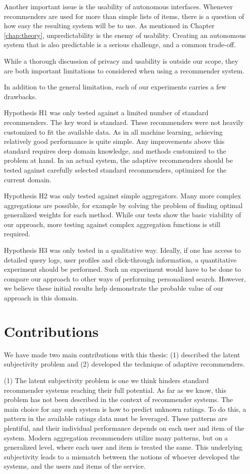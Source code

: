 Another important issue is the usability of autonomous interfaces.
Whenever recommenders are used for more than simple lists of items,
there is a question of how easy the resulting system will be to use.
As mentioned in Chapter \ref{chap:theory},
unpredictability is the enemy of usability.
Creating an autonomous system that is also
predictable is a serious challenge, and a common trade-off.

While a thorough discussion of privacy and usability is 
outside our scope, they are both important limitations to considered
when using a recommender system.

In addition to the general limitation, each of our experiments
carries a few drawbacks.

Hypothesis H1 was only tested against a limited number of standard recommenders.
The key word is standard. These recommenders were not heavily customized
to fit the available data. As in all machine learning,
achieving relatively good performance is quite simple.
Any improvements above this standard requires deep domain knowledge,
and methods customized to the problem at hand.
In an actual system, the adaptive recommenders should be tested
against carefully selected standard recommenders,
optimized for the current domain.

Hypothesis H2 was only tested against simple aggregators.
Many more complex aggregations are possible,
for example by solving the problem of finding
optimal generalized weights for each method.
While our tests show the basic viability of our approach,
more testing against complex aggregation functions
is still required.

Hypothesis H3 was only tested in a qualitative way.
Ideally, if one has access to detailed query logs,
user profiles and click-through information,
a quantitative experiment should be performed.
Such an experiment would have to be done
to compare our approach to other ways of performing
personalized search.
However, we believe these initial results
help demonstrate the probable value of our approach
in this domain.


\section{Contributions} 

We have made two main contributions with this thesis:
(1) described the latent subjectivity problem and
(2) developed the technique of adaptive recommenders.

(1) The latent subjectivity problem is one we think hinders
standard recommender systems reaching their full potential.
As far as we know, this problem has not been described
in the context of recommender systems.
The main choice for any such system is how to predict unknown ratings.
To do this, a pattern in the available ratings data must be leveraged.
These patterns are plentiful, and their individual performance
depends on each user and item of the system.
Modern aggregation recommenders utilize many patterns, but on a generalized
level, where each user and item is treated the same.
This underlying subjectivity leads to a mismatch between the notions
of whoever developed the systems, and the users and items of the service.


